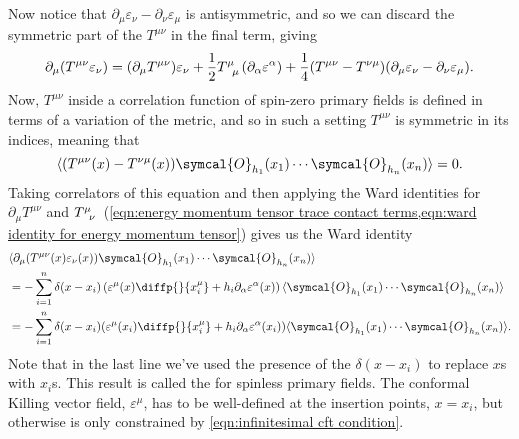 \documentclass[fleqn]{NotesClass}
\newcommand{\quantumField}[1]{\symcal{#1}}
\DeclarePairedDelimiter{\correlator}{\langle}{\rangle}
\begin{document}
    Now notice that \(\partial_\mu \varepsilon_\nu - \partial_\nu \varepsilon_\mu\) is antisymmetric, and so we can discard the symmetric part of the \(T^{\mu\nu}\) in the final term, giving
    \begin{equation}
        \partial_\mu (T^{\mu\nu}\varepsilon_\nu) = (\partial_\mu T^{\mu\nu})\varepsilon_\nu + \frac{1}{2}\tensor{T}{^\mu_\mu}(\partial_\alpha \varepsilon^\alpha) + \frac{1}{4}(T^{\mu\nu} - T^{\nu\mu})(\partial_\mu \varepsilon_\nu - \partial_\nu \varepsilon_\mu).
    \end{equation}
    Now, \(T^{\mu\nu}\) inside a correlation function of spin-zero primary fields is defined in terms of a variation of the metric, and so in such a setting \(T^{\mu\nu}\) is symmetric in its indices, meaning that
    \begin{equation}
        \label{eqn:energy momentum tensor symmetric in correlators}
        \correlator{(T^{\mu\nu}(x) - T^{\nu\mu}(x)) \quantumField{O}_{h_1}(x_1) \dotsm \quantumField{O}_{h_n}(x_n)} = 0.
    \end{equation}
    Taking correlators of this equation and then applying the Ward identities for \(\partial_\mu T^{\mu\nu}\) and \(\tensor{T}{^\mu_\nu}\) (\cref{eqn:energy momentum tensor trace contact terms,eqn:ward identity for energy momentum tensor}) gives us the Ward identity
    \begin{align}
        &\correlator{\partial_\mu(T^{\mu\nu}(x)\varepsilon_\nu(x)) \quantumField{O}_{h_1}(x_1) \dotsm \quantumField{O}_{h_n}(x_n)}\\
        &= -\sum_{i=1}^n \delta(x - x_i) \left( \varepsilon^\mu(x) \diffp{}{x_i^\mu} + h_i \partial_\alpha \varepsilon^\alpha(x) \right) \correlator{\quantumField{O}_{h_1}(x_1) \dotsm \quantumField{O}_{h_n}(x_n)}\\
        &= -\sum_{i=1}^n \delta(x - x_i)(\varepsilon^\mu(x_i) \diffp{}{x_i^\mu} + h_i \partial_\alpha \varepsilon^\alpha(x_i)) \correlator{\quantumField{O}_{h_1}(x_1) \dotsm \quantumField{O}_{h_n}(x_n)}.
    \end{align}
    Note that in the last line we've used the presence of the \(\delta(x - x_i)\) to replace \(x\)s with \(x_i\)s.
    This result is called the  for spinless primary fields.
    The conformal Killing vector field, \(\varepsilon^\mu\), has to be well-defined at the insertion points, \(x = x_i\), but otherwise is only constrained by \cref{eqn:infinitesimal cft condition}.
    
\end{document}
